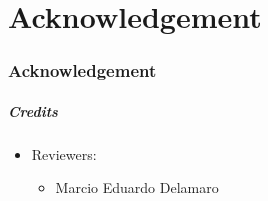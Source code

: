 \part{Acknowledgement}
\section*{Acknowledgement}


\begin{frame}[c,label=credits]
\frametitle{Credits}

\begin{itemize}
	\item Reviewers:
	\begin{itemize}
		\item Marcio Eduardo Delamaro
	\end{itemize}
\end{itemize}
\end{frame}
